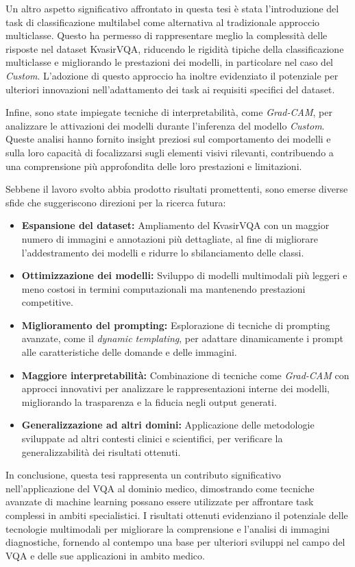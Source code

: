 \documentclass[../main.tex]{subfiles}
\begin{document}
Un altro aspetto significativo affrontato in questa tesi è stata l'introduzione del task di classificazione multilabel come alternativa al tradizionale approccio multiclasse. Questo ha permesso di rappresentare meglio la complessità delle risposte nel dataset KvasirVQA, riducendo le rigidità tipiche della classificazione multiclasse e migliorando le prestazioni dei modelli, in particolare nel caso del \textit{Custom}. L'adozione di questo approccio ha inoltre evidenziato il potenziale per ulteriori innovazioni nell'adattamento dei task ai requisiti specifici del dataset.

Infine, sono state impiegate tecniche di interpretabilità, come \textit{Grad-CAM}, per analizzare le attivazioni dei modelli durante l'inferenza del modello \textit{Custom}. Queste analisi hanno fornito insight preziosi sul comportamento dei modelli e sulla loro capacità di focalizzarsi sugli elementi visivi rilevanti, contribuendo a una comprensione più approfondita delle loro prestazioni e limitazioni.

Sebbene il lavoro svolto abbia prodotto risultati promettenti, sono emerse diverse sfide che suggeriscono direzioni per la ricerca futura: 

\begin{itemize} 
    \item \textbf{Espansione del dataset:} Ampliamento del KvasirVQA con un maggior numero di immagini e annotazioni più dettagliate, al fine di migliorare l'addestramento dei modelli e ridurre lo sbilanciamento delle classi. 
    \item \textbf{Ottimizzazione dei modelli:} Sviluppo di modelli multimodali più leggeri e meno costosi in termini computazionali ma mantenendo prestazioni competitive.
    \item \textbf{Miglioramento del prompting:} Esplorazione di tecniche di prompting avanzate, come il \textit{dynamic templating}, per adattare dinamicamente i prompt alle caratteristiche delle domande e delle immagini. 
    \item \textbf{Maggiore interpretabilità:} Combinazione di tecniche come \textit{Grad-CAM} con approcci innovativi per analizzare le rappresentazioni interne dei modelli, migliorando la trasparenza e la fiducia negli output generati. 
    \item \textbf{Generalizzazione ad altri domini:} Applicazione delle metodologie sviluppate ad altri contesti clinici e scientifici, per verificare la generalizzabilità dei risultati ottenuti. 
\end{itemize}

In conclusione, questa tesi rappresenta un contributo significativo nell'applicazione del VQA al dominio medico, dimostrando come tecniche avanzate di machine learning possano essere utilizzate per affrontare task complessi in ambiti specialistici. I risultati ottenuti evidenziano il potenziale delle tecnologie multimodali per migliorare la comprensione e l'analisi di immagini diagnostiche, fornendo al contempo una base per ulteriori sviluppi nel campo del VQA e delle sue applicazioni in ambito medico.
\end{document}
